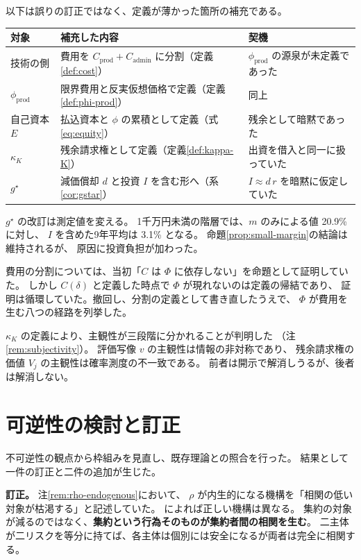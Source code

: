 以下は誤りの訂正ではなく、定義が薄かった箇所の補充である。

\begin{center}
\begin{tabularx}{\textwidth}{@{}lXl@{}}
\toprule
対象 & 補充した内容 & 契機 \\
\midrule
技術の側 & 費用を $C_{\mathrm{prod}}+C_{\mathrm{admin}}$ に分割（定義\ref{def:cost}） & $\phi_{\mathrm{prod}}$ の源泉が未定義であった \\
$\phi_{\mathrm{prod}}$ & 限界費用と反実仮想価格で定義（定義\ref{def:phi-prod}） & 同上 \\
自己資本 $E$ & 払込資本と $\phi$ の累積として定義（式\eqref{eq:equity}） & 残余として暗黙であった \\
$\kappa_K$ & 残余請求権として定義（定義\ref{def:kappa-K}） & 出資を借入と同一に扱っていた \\
$g^\star$ & 減価償却 $d$ と投資 $I$ を含む形へ（系\ref{cor:gstar}） & $I\approx d\,r$ を暗黙に仮定していた \\
\bottomrule
\end{tabularx}
\label{tab:definition-supplements}
\end{center}

$g^\star$ の改訂は測定値を変える。
1千万円未満の階層では、$m$ のみによる値 20.9\% に対し、
$I$ を含めた9年平均は 3.1\% となる。
命題\ref{prop:small-margin}の結論は維持されるが、
原因に投資負担が加わった。

費用の分割については、当初「$C$ は $\Phi$ に依存しない」を命題として証明していた。
しかし $C(\delta)$ と定義した時点で $\Phi$ が現れないのは定義の帰結であり、
証明は循環していた。撤回し、分割の定義として書き直したうえで、
$\Phi$ が費用を生む八つの経路を列挙した。

$\kappa_K$ の定義により、主観性が三段階に分かれることが判明した
（注\ref{rem:subjectivity}）。
評価写像 $v$ の主観性は情報の非対称であり、
残余請求権の価値 $V_j$ の主観性は確率測度の不一致である。
前者は開示で解消しうるが、後者は解消しない。

\section{可逆性の検討と訂正}

不可逆性の観点から枠組みを見直し、既存理論との照合を行った。
結果として一件の訂正と二件の追加が生じた。

\textbf{訂正。} 注\ref{rem:rho-endogenous}において、
$\rho$ が内生的になる機構を「相関の低い対象が枯渇する」と記述していた。
\cite{wagner2010} によれば正しい機構は異なる。
集約の対象が減るのではなく、\textbf{集約という行為そのものが集約者間の相関を生む}。
二主体が二リスクを等分に持てば、各主体は個別には安全になるが両者は完全に相関する。

